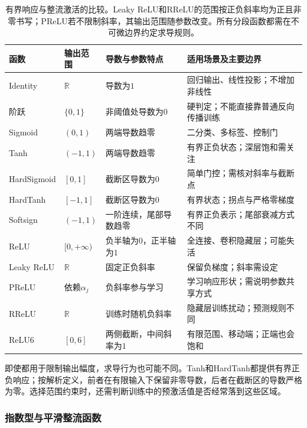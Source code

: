 \begin{table}[htb]
  \centering
  \small
  \begin{tabularx}{\linewidth}{@{}l l X X@{}}
    \toprule
    函数 & 输出范围 & 导数与参数特点 & 适用场景及主要边界 \\
    \midrule
    Identity & $\mathbb{R}$ & 导数为$1$ & 回归输出、线性投影；不增加非线性 \\
    阶跃 & $\{0,1\}$ & 非阈值处导数为$0$ & 硬判定；不能直接靠普通反向传播训练 \\
    Sigmoid & $(0,1)$ & 两端导数趋零 & 二分类、多标签、控制门 \\
    Tanh & $(-1,1)$ & 两端导数趋零 & 有界正负状态；深层饱和需关注 \\
    HardSigmoid & $[0,1]$ & 截断区导数为$0$ & 简单门控；需核对斜率与截断点 \\
    HardTanh & $[-1,1]$ & 截断区导数为$0$ & 有界状态；拐点与严格零梯度 \\
    Softsign & $(-1,1)$ & 一阶连续，尾部导数趋零 & 有界正负表示；尾部衰减方式不同 \\
    ReLU & $[0,+\infty)$ & 负半轴为$0$，正半轴为$1$ & 全连接、卷积隐藏层；可能失活 \\
    Leaky ReLU & $\mathbb{R}$ & 固定正负斜率 & 保留负梯度；斜率需设定 \\
    PReLU & 依赖$\alpha_j$ & 负斜率参与学习 & 学习响应形状；需说明参数共享方式 \\
    RReLU & $\mathbb{R}$ & 训练时随机负斜率 & 隐藏层训练扰动；预测规则不同 \\
    ReLU6 & $[0,6]$ & 两侧截断，中间斜率为$1$ & 有限范围、移动端；正端也会饱和 \\
    \bottomrule
  \end{tabularx}
  \caption{有界响应与整流激活的比较。Leaky ReLU和RReLU的范围按正负斜率均为正且非零书写；PReLU若不限制斜率，其输出范围随参数改变。所有分段函数都需在不可微边界约定求导规则。}
  \label{tab:ffn-activation-bounded}
\end{table}

即使都用于限制输出幅度，求导行为也可能不同。Tanh和HardTanh都提供有界正负响应；按解析定义，前者在有限输入下保留非零导数，后者在截断区的导数严格为零。选择范围约束时，还需判断训练中的预激活值是否经常落到这些区域。

\subsubsection{指数型与平滑整流函数}
\label{sec:ffn-activation-exponential}


